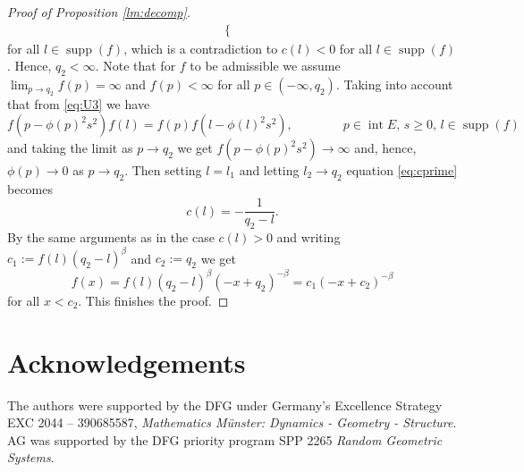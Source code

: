 \documentclass[11pt,a4paper]{article}
\theoremstyle{plain}
\theoremstyle{definition}
\theoremstyle{remark}
\DeclareMathOperator\supp{supp}
\newcommand{\inter}{\operatorname{int}}
\begin{document}
\begin{proof}[Proof of Proposition \ref{lm:decomp}]
\begin{align*}
\begin{cases}
        \end{cases}
    \end{align*}
    for all $l\in \supp(f)$, which is a contradiction to $c(l)<0$ for all $l\in \supp(f)$. Hence, $q_2<\infty$. Note that for $f$ to be admissible we assume $\lim_{p\to q_2} f(p)=\infty$ and $f(p)<\infty$ for all $p\in (-\infty, q_2)$. Taking into account that from \eqref{eq:U3} we have
    \[
        f(p-\phi(p)^2s^2)f(l)=f(p)f(l-\phi(l)^2s^2), \qquad\qquad p\in \inter E,\, s\ge 0,\, l\in \supp(f)
    \]
    and taking the limit as $p\to q_2$ we get $f(p-\phi(p)^2s^2)\to \infty$ and, hence, $\phi(p)\to 0$ as $p\to q_2$. Then setting $l=l_1$ and letting $l_2\to q_2$ equation \eqref{eq:cprime} becomes
    \[
        c(l)=-\frac{1}{q_2-l}.
    \]
    By the same arguments as in the case $c(l)>0$ and writing $c_1:=f(l)(q_2-l)^{\beta}$ and $c_2:=q_2$ we get 
    \[
        f(x)=f(l)(q_2-l)^{\beta}(-x+q_2)^{-\beta}=c_1(-x+c_2)^{-\beta}
    \]
    for all $x<c_2$. This finishes the proof.
    
\end{proof}

\section*{Acknowledgements}

The authors were supported by the DFG under Germany's Excellence Strategy  EXC 2044 -- 390685587, \textit{Mathematics M\"unster: Dynamics - Geometry - Structure}. AG was supported by the DFG priority program SPP 2265 \textit{Random Geometric Systems}.
    
\end{document}
